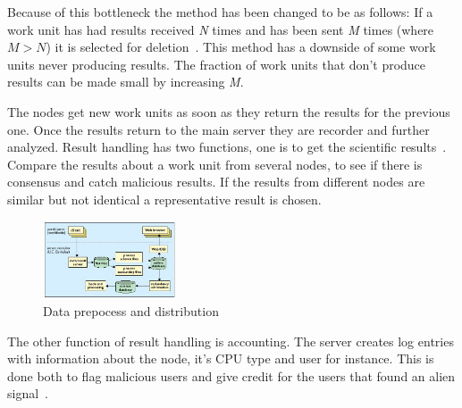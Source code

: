 Because of this bottleneck the method has been changed to be as follows: 
If a work unit has had results received \textit{N} times and has been sent 
\textit{M} times (where $M>N$) it is selected for 
deletion~\cite{hid-sp18-601-paper-anderson2002seti}. This method has 
a downside of some work units never producing results. The fraction of work
units that don't produce results can be made small by increasing \textit{M}.

The nodes get new work units as soon as they return the results for the 
previous one. Once the results return to the main server they are recorder 
and further analyzed. Result handling has two functions, one is to 
get the scientific results~\cite{hid-sp18-601-paper-anderson2002seti}. 
Compare the results about a work unit from several nodes, to see if there 
is consensus and catch malicious results. 
If the results from different nodes are similar but not identical a 
representative result is chosen.

\begin{figure}[!htb]
        \centering
        \includegraphics[width=0.35\textwidth]{figures/data-return.jpg}
        \caption{Data prepocess and
        distribution~\cite{hid-sp18-601-paper-anderson2002seti}}\label{datasend}
\end{figure}

The other function of result handling is accounting. The server creates 
log entries with information about the node, it's CPU type and user for 
instance. This is done both to flag malicious users and give credit for
the users that found an alien signal~\cite{hid-sp18-601-paper-anderson2002seti}.

